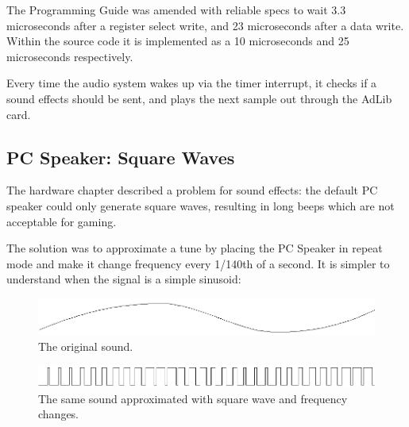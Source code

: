 \documentclass[book.tex]{subfiles}
\begin{document}
\par
The Programming Guide was amended with reliable specs to wait 3.3 microseconds after a register select write, and 23 microseconds after a data write. Within the source code it is implemented as a 10 microseconds and 25 microseconds respectively.
\par
\begin{minipage}{\textwidth}

\end{minipage}
\par

Every time the audio system wakes up via the timer interrupt, it checks if a sound effects should be sent, and plays the next sample out through the AdLib card.\\

\subsection{PC Speaker: Square Waves}
The hardware chapter described a problem for sound effects: the default PC speaker could only generate square waves, resulting in long beeps which are not acceptable for gaming.\\
\par
The solution was to approximate a tune by placing the PC Speaker in repeat mode and make it change frequency every 1/140th of a second. It is simpler to understand when the signal is a simple sinusoid:
\par
\begin{figure}[H]
\centering
 \includegraphics[width=\textwidth]{imgs/drawings/pwm/sinuois.png}
 \caption{The original sound.}
 \end{figure}
\par

\par
\begin{figure}[H]
\centering
 \includegraphics[width=\textwidth]{imgs/drawings/pwm/pwm_approximation.png}
 \caption{The same sound approximated with square wave and frequency changes.}
 \end{figure}
\par
\end{document}
